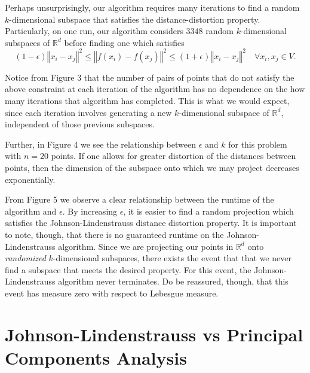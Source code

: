 \documentclass{article}
\begin{document}
\noindent
Perhaps unsurprisingly, our algorithm requires many iterations to find a random $k$-dimensional subspace that satisfies the distance-distortion property. Particularly, on one run, our algorithm considers $3348$ random $k$-dimensional subspaces of $\mathbb{R}^d$ before finding one which satisfies
$$(1 - \epsilon) \left \Vert x_i - x_j \right \Vert^2 \leq \left \Vert f(x_i) - f(x_j) \right \Vert^2 \leq (1 + \epsilon) \left \Vert x_i - x_j \right \Vert^2 \quad \forall x_i, x_j \in V.$$

\noindent
Notice from Figure 3 that the number of pairs of points that do not satisfy the above constraint at each iteration of the algorithm has no dependence on the how many iterations that algorithm has completed. This is what we would expect, since each iteration involves generating a new $k$-dimensional subspace of $\mathbb{R}^d$, independent of those previous subspaces. 

\noindent 
Further, in Figure 4 we see the relationship between $\epsilon$ and $k$ for this problem with $n = 20$ points. If one allows for greater distortion of the distances between points, then the dimension of the subspace onto which we may project decreases exponentially. 

\noindent
From Figure 5 we observe a clear relationship between the runtime of the algorithm and $\epsilon$. By increasing $\epsilon$, it is easier to find a random projection which satisfies the Johnson-Lindenstrauss distance distortion property. It is important to note, though, that there is no guaranteed runtime on the Johnson-Lindenstrauss algorithm. Since we are projecting our points in $\mathbb{R}^d$ onto \textit{randomized} $k$-dimensional subspaces, there exists the event that that we never find a subspace that meets the desired property. For this event, the Johnson-Lindenstrauss algorithm never terminates. Do be reassured, though, that this event has measure zero with respect to Lebesgue measure.


\newpage
\section{Johnson-Lindenstrauss vs Principal Components Analysis}
\end{document}
